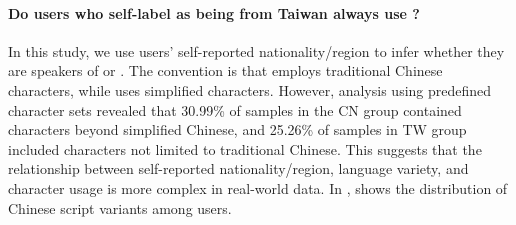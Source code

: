 

\paragraph{Do users who self-label as being from Taiwan always use \twChinese?}
In this study, we use users' self-reported nationality/region to infer whether they are speakers of \twChinese or \cnChinese. 
The convention is that \twChinese employs traditional Chinese characters, while \cnChinese uses simplified characters. 
However, analysis using predefined character sets revealed that 30.99\% of samples in the CN group contained characters beyond simplified Chinese, and 25.26\% of samples in TW group included characters not limited to traditional Chinese. 
This suggests that the relationship between self-reported nationality/region, language variety, and character usage is more complex in real-world data.
In ,  shows the distribution of Chinese script variants among users.


